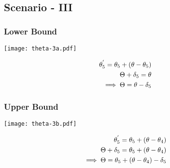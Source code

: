 \subsection{Scenario - III}

\subsubsection{Lower Bound}

\begin{minipage}[t]{0.5\textwidth}
\texttt{[image: theta-3a.pdf]}  
\end{minipage}
\begin{minipage}[t]{0.5\textwidth}
\vspace{-1in}
\begin{equation*}
\centering
\begin{aligned}
\theta_5^{'} = \theta_5 + (\theta - \theta_5)\\
\Theta + \delta_5 = \theta \\
\implies \Theta = \theta - \delta_5
\end{aligned}
\end{equation*}
\end{minipage}






\subsubsection{Upper Bound}

\begin{minipage}[t]{0.5\textwidth}
\texttt{[image: theta-3b.pdf]}  
\end{minipage}
\begin{minipage}[t]{0.5\textwidth}
\vspace{-1in}
\begin{equation*}
\centering
\begin{aligned}
\theta_5^{'} = \theta_5 + (\theta - \theta_4)\\
\Theta + \delta_5 = \theta_5 + (\theta - \theta_4)\\
\implies \Theta = \theta_5 + (\theta - \theta_4) - \delta_5
\end{aligned}
\end{equation*}
\end{minipage}









